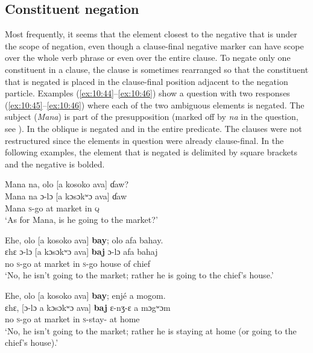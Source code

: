 \subsection{Constituent negation}\label{sec:10.2.3}
\hypertarget{RefHeading1212961525720847}{}
Most frequently, it seems that the element closest to the negative that is under the scope of negation, even though a clause-final negative marker can have scope over the whole verb phrase or even over the entire clause. To negate only one constituent in a clause, the clause is sometimes rearranged so that the constituent that is negated is placed in the clause-final position adjacent to the negation particle. Examples (\ref{ex:10:44}--\ref{ex:10:46}) show a question  with two responses (\ref{ex:10:45}--\ref{ex:10:46}) where each of the two ambiguous elements is negated. The subject (\textit{Mana}) is part of the presupposition (marked off by \textit{na} in the question, see ). In  the oblique is negated and in  the entire predicate. The clauses were not restructured since the elements in question were already clause-final. In the following examples, the element that is negated is delimited by square brackets and the negative is bolded.

\ea \label{ex:10:44}
Mana  na,  olo  [a  kosoko  ava]  ɗaw?\\
\gll  Mana   na   ɔ{}-lɔ   [a   kɔsɔkʷɔ   ava]  ɗaw\\
      Mana  {\PSP}  \textsc{s}-go  at  market  in  {\textsc{q}}\\
\glt  ‘As for Mana, is he going to the market?’
\z

\ea \label{ex:10:45}
Ehe,  olo  [a  kosoko  ava]  \textbf{bay};  olo  afa  bahay.\\
\gll  ɛhɛ     ɔ-lɔ   [a   kɔsɔkʷɔ   ava]  \textbf{baj}    ɔ-lɔ   afa     bahaj\\
      no    \textsc{s}-go  at  market  in  {\NEG}  \textsc{s}-go  {house of}    chief\\
\glt  ‘No, he isn’t going to the market; rather he is going to the chief’s house.’
\z

\ea \label{ex:10:46}
Ehe,  olo  [a  kosoko  ava]  \textbf{bay};  enjé  a  mogom.\\
\gll  ɛhɛ,   [ɔ-lɔ   a   kɔsɔkʷɔ   ava]  \textbf{baj}   ɛ-nʒ-ɛ     a   mɔgʷɔm\\
      no    \textsc{s}-go  at  market  in  {\NEG}  \textsc{s}-stay-{\CL}  at  home\\
\glt  ‘No, he isn’t going to the market; rather he is staying at home (or going to the chief’s house).’
\z


